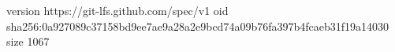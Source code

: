 version https://git-lfs.github.com/spec/v1
oid sha256:0a927089c37158bd9ee7ae9a28a2e9bcd74a09b76fa397b4fcaeb31f19a14030
size 1067
